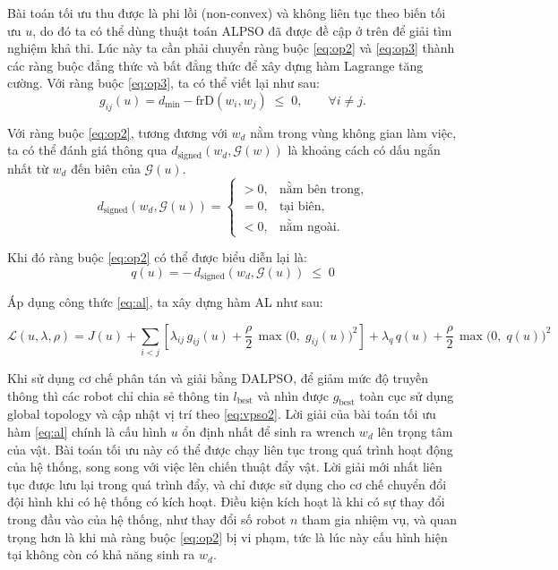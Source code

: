 Bài toán tối ưu thu được là phi lồi (non-convex) và không liên tục theo biến tối ưu $u$, do đó ta có thể dùng thuật toán ALPSO đã được đề cập ở trên để giải tìm nghiệm khả thi. Lúc này ta cần phải chuyển ràng buộc \ref{eq:op2} và \ref{eq:op3} thành các ràng buộc đẳng thức và bất đẳng thức để xây dựng hàm Lagrange tăng cường. Với ràng buộc \ref{eq:op3}, ta có thể viết lại như sau:
\begin{equation}
\label{eq:op1a}
g_{ij}(u) = d_{\min} - \mathrm{frD}(w_i, w_j) \;\le\; 0,
\qquad \forall i \neq j .
\end{equation}

Với ràng buộc \ref{eq:op2}, tương đương với $w_d$ nằm trong vùng không gian làm việc, ta có thể đánh giá thông qua $d_{\mathrm{signed}}(w_d, \mathcal{G}(w))$ là khoảng cách có dấu ngắn nhất từ $w_d$ đến biên của $\mathcal{G}(u)$.
\begin{equation}
d_{\mathrm{signed}}(w_d, \mathcal{G}(u))
=
\begin{cases}
> 0, & \text{nằm bên trong},\\[4pt]
= 0, & \text{tại biên},\\[4pt]
< 0, & \text{nằm ngoài}.
\end{cases}
\end{equation}

Khi đó ràng buộc \ref{eq:op2} có thể được biểu diễn lại là:
\begin{equation}
\label{eq:qu}
q(u)
= -\, d_{\mathrm{signed}}(w_d, \mathcal{G}(u))
\;\le\; 0
\end{equation}

Áp dụng công thức \ref{eq:al}, ta xây dựng hàm AL như sau:

\begin{equation}
\label{eq:ala}
\mathcal{L}(u,\lambda,\rho)
= J(u)
+ \sum_{i<j} \left[ \lambda_{ij}\, g_{ij}(u) + \frac{\rho}{2}\, \max\big(0,\; g_{ij}(u)\big)^{2} \right]
+ \lambda_{q}\, q(u)
+ \frac{\rho}{2}\, \max\big(0,\; q(u)\big)^{2}
\end{equation}

Khi sử dụng cơ chế phân tán và giải bằng DALPSO, để giảm mức độ truyền thông thì các robot chỉ chia sẻ thông tin $l_\text{best}$ và nhìn được $g_\text{best}$ toàn cục sử dụng global topology và cập nhật vị trí theo \ref{eq:vpso2}. Lời giải của bài toán tối ưu hàm \ref{eq:al} chính là cấu hình $u$ ổn định nhất để sinh ra wrench $w_d$ lên trọng tâm của vật. Bài toán tối ưu này có thể được chạy liên tục trong quá trình hoạt động của hệ thống, song song với việc lên chiến thuật đẩy vật. Lời giải mới nhất liên tục được lưu lại trong quá trình đẩy, và chỉ được sử dụng cho cơ chế chuyển đổi đội hình khi có hệ thống có kích hoạt. Điều kiện kích hoạt là khi có sự thay đổi trong đầu vào của hệ thống, như thay đổi số robot $n$ tham gia nhiệm vụ, và quan trọng hơn là khi mà ràng buộc \ref{eq:op2} bị vi phạm, tức là lúc này cấu hình hiện tại không còn có khả năng sinh ra $w_d$.


